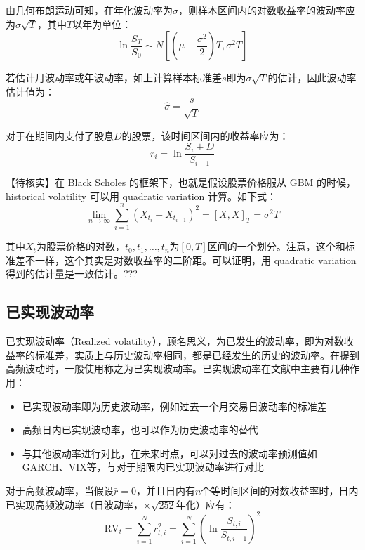 \documentclass[11pt]{article}
\begin{document}
由几何布朗运动可知，在年化波动率为$\sigma$，则样本区间内的对数收益率的波动率应为$\sigma \sqrt{T}$，其中$T$以年为单位：
\begin{equation*}
    \ln \frac{S_T}{S_0} \sim N\left[ \left(\mu-\frac{\sigma^2}{2}\right)T ,\sigma^2 T \right]
\end{equation*}

若估计月波动率或年波动率，如上计算样本标准差$s$即为$\sigma \sqrt{T}$的估计，因此波动率估计值为：
\begin{equation*}
    \hat{\sigma} = \frac{s}{\sqrt{T}}
\end{equation*}

对于在期间内支付了股息$D$的股票，该时间区间内的收益率应为：
\begin{equation*}
    r_i = \ln \frac{S_i + D}{S_{i-1}}
\end{equation*}

【待核实】在 Black Scholes 的框架下，也就是假设股票价格服从 GBM 的时候，historical volatility 可以用 quadratic variation 计算。如下式：
\begin{equation*}
    \lim_{n\rightarrow \infty} \sum^{n}_{i=1}(X_{t_i} - X_{t_{i-1}})^2 = [X,X]_T = \sigma^2 T
\end{equation*}

其中$X_t$为股票价格的对数，$t_0,t_1,\dots,t_n$为$[0,T]$区间的一个划分。注意，这个和标准差不一样，这个其实是对数收益率的二阶距。可以证明，用 quadratic variation 得到的估计量是一致估计。???

\subsection{已实现波动率}

已实现波动率（Realized volatility），顾名思义，为已发生的波动率，即为对数收益率的标准差，实质上与历史波动率相同，都是已经发生的历史的波动率。在提到高频波动时，一般使用称之为已实现波动率。已实现波动率在文献中主要有几种作用：

\begin{itemize}
    \item 已实现波动率即为历史波动率，例如过去一个月交易日波动率的标准差
    \item 高频日内已实现波动率，也可以作为历史波动率的替代
    \item 与其他波动率进行对比，在未来时点，可以对过去的波动率预测值如GARCH、VIX等，与对于期限内已实现波动率进行对比
\end{itemize}

对于高频波动率，当假设$\bar{r} = 0$，并且日内有$n$个等时间区间的对数收益率时，日内已实现高频波动率（日波动率，$\times \sqrt{252}$年化）应有：
\begin{equation*}
    \text{RV}_t = \sum^{N}_{i=1} r^2_{t,i} = \sum^{N}_{i=1} \left( \ln \frac{S_{t,i}}{S_{t,i-1}} \right)^2
\end{equation*}
\end{document}
